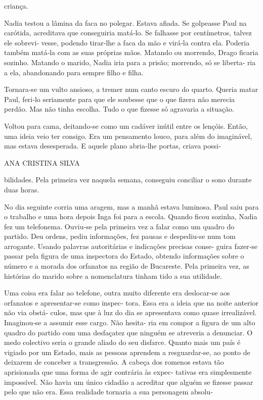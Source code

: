 criança.

Nadia testou a lâmina da faca no polegar. Estava afiada. Se golpeasse
Paul na carótida, acreditava que conseguiria matá‑lo. Se falhasse por
centímetros, talvez ele sobrevi‑ vesse, podendo tirar‑lhe a faca da mão
e virá‑la contra ela. Poderia também matá‑la com as suas próprias mãos.
Matando ou morrendo, Drago ficaria sozinho. Matando o marido, Nadia iria
para a prisão; morrendo, só se liberta‑ ria a ela, abandonando para
sempre filho e filha.

Tornara‑se um vulto ansioso, a tremer num canto escuro do quarto. Queria
matar Paul, feri‑lo seriamente para que ele soubesse que o que fizera
não merecia perdão. Mas não tinha escolha. Tudo o que fizesse só
agravaria a situação.

Voltou para cama, deitando‑se como um cadáver inútil entre os lençóis.
Então, uma ideia veio ter consigo. Era um pensamento louco, para além do
imaginável, mas estava desesperada. E aquele plano abria‑lhe portas,
criava possi‑

ANA CRISTINA SILVA

bilidades. Pela primeira vez naquela semana, conseguiu conciliar o sono
durante duas horas.

No dia seguinte corria uma aragem, mas a manhã estava luminosa. Paul
saiu para o trabalho e uma hora depois Inga foi para a escola. Quando
ficou sozinha, Nadia fez um telefonema. Ouviu‑se pela primeira vez a
falar como um quadro do partido. Deu ordens, pediu informações, fez
pausas e despediu‑se num tom arrogante. Usando palavras autoritárias e
indicações precisas conse‑ guira fazer‑se passar pela figura de uma
inspectora do Estado, obtendo informações sobre o número e a morada dos
orfanatos na região de Bucareste. Pela primeira vez, as histórias do
marido sobre a nomenclatura tinham tido a sua utilidade.

Uma coisa era falar ao telefone, outra muito diferente era deslocar‑se
aos orfanatos e apresentar‑se como inspec‑ tora. Essa era a ideia que na
noite anterior não via obstá‑ culos, mas que à luz do dia se apresentava
como quase irrealizável. Imaginou‑se a assumir esse cargo. Não hesita‑
ria em compor a figura de um alto quadro do partido com uma desfaçatez
que ninguém se atreveria a denunciar. O medo colectivo seria o grande
aliado do seu disfarce. Quanto mais um país é vigiado por um Estado,
mais as pessoas aprendem a resguardar‑se, ao ponto de deixarem de
conceber a transgressão. A cabeça dos romenos estava tão aprisionada que
uma forma de agir contrária às expec‑ tativas era simplesmente
impossível. Não havia um único cidadão a acreditar que alguém se fizesse
passar pelo que não era. Essa realidade tornaria a sua personagem
absolu‑

